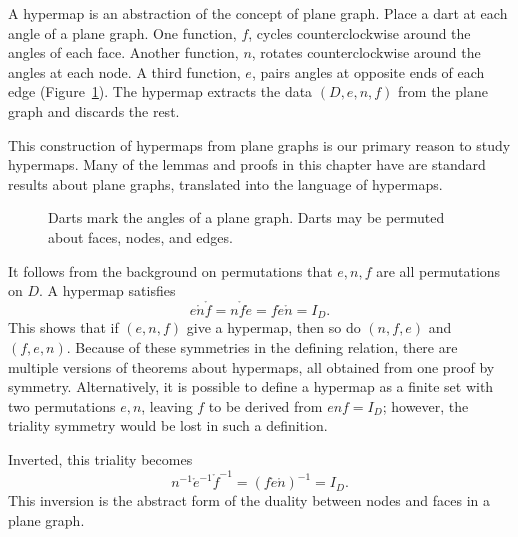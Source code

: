 \begin{remark}\label{rem:hypermap} 
  A hypermap is an abstraction of the concept of plane graph.  Place a
  dart at each angle of a plane graph.  One function, $f$, cycles
  counterclockwise around the angles of each face.  Another function,
  $n$, rotates counterclockwise around the angles at each node.  A
  third function, $e$, pairs angles at opposite ends of each edge
  (Figure~\ref{fig:hypermap_ex}).  The hypermap extracts the data
  $(D,e,n,f)$ from the plane graph and discards the rest.

  This construction of hypermaps from plane graphs is our primary
  reason to study hypermaps.  Many of the lemmas and proofs in this
  chapter have are standard results about plane graphs, translated
  into the language of hypermaps.  
%
%
\end{remark}

\begin{figure}[htb]
\centering
{}
\caption{Darts mark the angles of a plane graph.  Darts may be
  permuted about faces, nodes, and edges.}
\label{fig:hypermap_ex}
\end{figure}

It follows from the background on permutations that $e,n,f$ are all permutations on $D$.
A hypermap satisfies 
\begin{equation}\label{eqn:triality}
e \ocirc n\ocirc f = n\ocirc f\ocirc e = f\ocirc e\ocirc n = I_D.
\end{equation}
This  shows that if $(e,n,f)$ give a
hypermap, then so do $(n,f,e)$ and $(f,e,n)$.  Because of these
symmetries in the defining relation, there are multiple versions of
theorems about hypermaps, all obtained from one proof by symmetry.
Alternatively, it is possible to define a hypermap as a finite set
with two permutations $e,n$, leaving $f$ to be derived from $e n f =
I_D$; however, the triality symmetry would be lost in such a
definition.

Inverted, this triality becomes
\[ 
n^{-1} \ocirc e^{-1} \ocirc f^{-1} = (f \ocirc e \ocirc n)^{-1} = I_D.
\] 
This inversion is the abstract form of the duality between nodes
and faces in a plane graph. 


